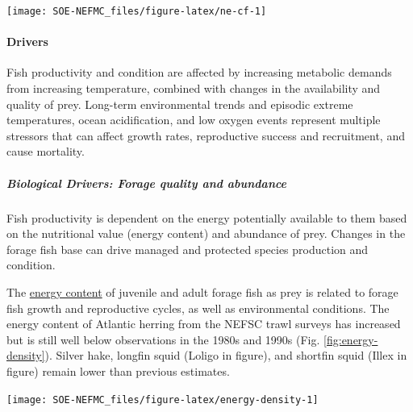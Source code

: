 \documentclass[
  10pt,
]{article}
\let\origfigure\figure
\let\endorigfigure\endfigure
\renewenvironment{figure}[1][2] {
    \expandafter\origfigure\expandafter[H]
} {
    \endorigfigure
}
\begin{document}
\begin{figure}

{\centering \texttt{[image: SOE-NEFMC\_files/figure-latex/ne-cf-1]} 

}

\caption{Condition factor for fish species in New England based on fall NEFSC bottom trawl survey data. No survey was conducted in 2020.}\label{fig:ne-cf}
\end{figure}

\hypertarget{drivers-2}{%
\paragraph{Drivers}\label{drivers-2}}

Fish productivity and condition are affected by increasing metabolic demands from increasing temperature, combined with changes in the availability and quality of prey. Long-term environmental trends and episodic extreme temperatures, ocean acidification, and low oxygen events represent multiple stressors that can affect growth rates, reproductive success and recruitment, and cause mortality.

\hypertarget{biological-drivers-forage-quality-and-abundance}{%
\subparagraph{Biological Drivers: Forage quality and abundance}\label{biological-drivers-forage-quality-and-abundance}}

Fish productivity is dependent on the energy potentially available to them based on the nutritional value (energy content) and abundance of prey. Changes in the forage fish base can drive managed and protected species production and condition.

The \href{https://noaa-edab.github.io/catalog/energy_density.html}{energy content} of juvenile and adult forage fish as prey is related to forage fish growth and reproductive cycles, as well as environmental conditions. The energy content of Atlantic herring from the NEFSC trawl surveys has increased but is still well below observations in the 1980s and 1990s (Fig. \ref{fig:energy-density}). Silver hake, longfin squid (Loligo in figure), and shortfin squid (Illex in figure) remain lower than previous estimates.

\begin{figure}

{\centering \texttt{[image: SOE-NEFMC\_files/figure-latex/energy-density-1]} 

}

\caption{Forage fish energy density mean and standard deviation by season and year, compared with 1980s (solid line; Steimle and Terranove 1985) and 1990s (dashed line; Lawson et al. 1998) values.}\label{fig:energy-density}
\end{figure}
\end{document}
